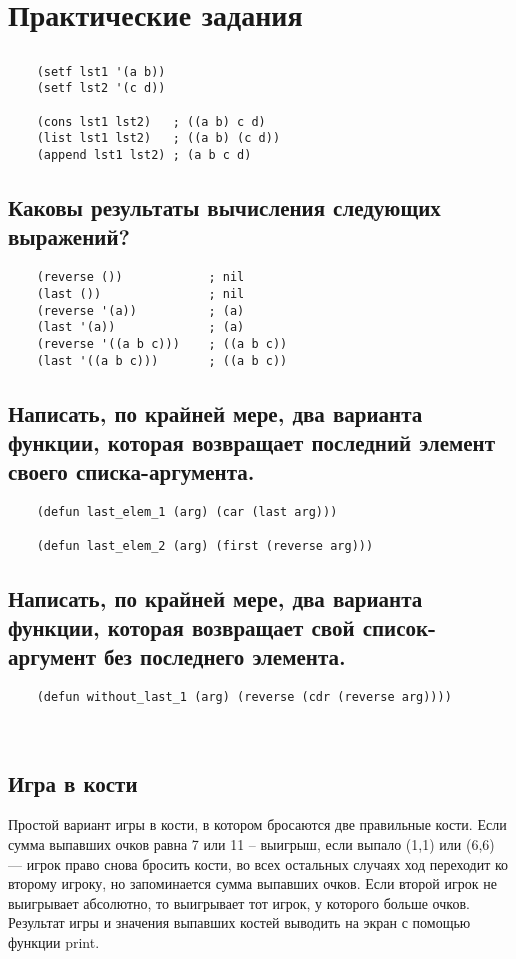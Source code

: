 \chapter{Практические задания}
\section{}
\begin{lstlisting}
	(setf lst1 '(a b))
	(setf lst2 '(c d))
	
	(cons lst1 lst2)   ; ((a b) c d) 
	(list lst1 lst2)   ; ((a b) (c d))
	(append lst1 lst2) ; (a b c d)
\end{lstlisting}
\section{Каковы результаты вычисления следующих выражений?}
\begin{lstlisting}
	(reverse ()) 			; nil
	(last ())				; nil
	(reverse '(a))			; (a)
	(last '(a))				; (a)
	(reverse '((a b c)))	; ((a b c))
	(last '((a b c)))		; ((a b c))
\end{lstlisting}

\section{Написать, по крайней мере, два варианта функции, которая возвращает последний элемент своего списка-аргумента.}
\begin{lstlisting}
	(defun last_elem_1 (arg) (car (last arg)))
	
	(defun last_elem_2 (arg) (first (reverse arg)))
\end{lstlisting}

\section{Написать, по крайней мере, два варианта функции, которая возвращает свой список-аргумент без последнего элемента.}
\begin{lstlisting}
	(defun without_last_1 (arg) (reverse (cdr (reverse arg))))
	
	
\end{lstlisting}

\section{Игра в кости}
Простой вариант игры в кости, в котором бросаются две правильные кости. Если
сумма выпавших очков равна 7 или 11 -- выигрыш, если выпало (1,1) или (6,6) --- игрок право снова бросить кости, во всех остальных случаях ход переходит ко второму игроку, но запоминается сумма выпавших очков. Если второй игрок не выигрывает абсолютно, то выигрывает тот игрок, у которого больше очков. Результат игры и значения выпавших костей выводить на экран с помощью функции print.


